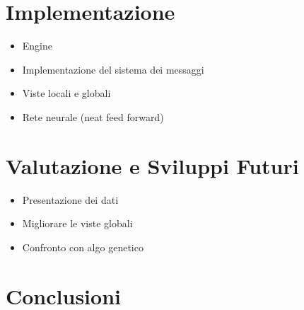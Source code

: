 \documentclass[a4paper,10pt,abstracton]{scrartcl}
\begin{document}
\section{Implementazione}
\begin{itemize}
 \item Engine
 \item Implementazione del sistema dei messaggi
 \item Viste locali e globali
 \item Rete neurale (neat feed forward)
\end{itemize}


\section{Valutazione e Sviluppi Futuri}
\begin{itemize}
 \item Presentazione dei dati
 \item Migliorare le viste globali
 \item Confronto con algo genetico
\end{itemize}


\section{Conclusioni}
\end{document}
